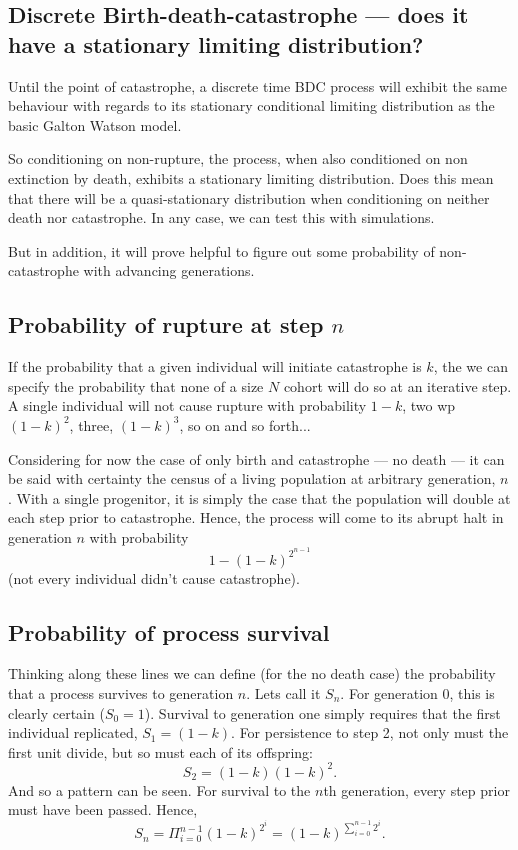 \subsection{Discrete Birth-death-catastrophe --- does it have a stationary limiting distribution?}

Until the point of catastrophe, a discrete time BDC process will exhibit the same behaviour with regards to its stationary conditional limiting distribution as the basic Galton Watson model. \par
So conditioning on non-rupture, the process, when also conditioned on non extinction by death, exhibits a stationary limiting distribution. Does this mean that there will be a quasi-stationary distribution when conditioning on neither death nor catastrophe. In any case, we can test this with simulations.\par
But in addition, it will prove helpful to figure out some probability of non-catastrophe with advancing generations.
\subsection*{Probability of rupture at step $n$}

If the probability that a given individual will initiate catastrophe is $k$, the we can specify the probability that none of a size $N$ cohort will do so at an iterative step. A single individual will not cause rupture with probability $1-k$, two wp $(1-k)^2$, three, $(1-k)^3$, so on and so forth... \par
Considering for now the case of only birth and catastrophe --- no death --- it can be said with certainty the census of a living population at arbitrary generation, $n$. With a single progenitor, it is simply the case that the population will double at each step prior to catastrophe. Hence, the process will come to its abrupt halt in generation $n$ with probability
$$1-(1-k)^{2^{n-1}}$$
(not every individual didn't cause catastrophe).

\subsection*{Probability of process survival}
Thinking along these lines we can define (for the no death case)  the probability that a process survives to generation $n$. Lets call it $S_n$. For generation 0, this is clearly certain ($S_0=1$). Survival to generation one simply requires that the first individual replicated, $S_1 = (1-k)$. For persistence to step 2, not only must the first unit divide, but so must each of its offspring: $$S_2 = (1-k)(1-k)^2.$$ And so a pattern can be seen. For survival to the $n$th generation, every step prior must have been passed. Hence,
$$S_n = \Pi_{i = 0}^{n-1} (1-k)^{2^i} = (1-k)^{\sum^{n-1}_{i=0}2^i}.$$

